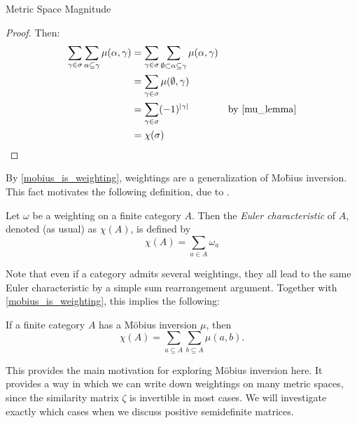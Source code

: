 \documentclass[12pt]{pom_thesis}
\begin{document}
\begin{chapter}{Metric Space Magnitude}
\begin{thm}
\end{thm}
\begin{proof}
Then:
\begin{align*}
\sum_{\gamma \in \sigma} \sum_{\alpha \subseteq \gamma} \mu(\alpha, \gamma) &= \sum_{\gamma \in \sigma} \sum_{\emptyset \subset \alpha \subseteq \gamma} \mu(\alpha, \gamma)\\
&= \sum_{\gamma \in \sigma} \mu(\emptyset, \gamma)\\
&= \sum_{\gamma \in \sigma} (-1)^{|\gamma|} &\text{by \ref{mu_lemma}}\\
&= \chi(\sigma)
\end{align*}
\end{proof}
By \ref{mobius_is_weighting}, weightings are a generalization of Mo\"bius inversion. This fact motivates the following definition, due to \cite{Lein1}.
\begin{defn}
Let $\omega$ be a weighting on a finite category $A$. Then the \emph{Euler characteristic} of $A$, denoted (as usual) as $\chi(A)$, is defined by
\[
\chi(A) = \sum_{a \in A} \omega_a
\]
\end{defn}
Note that even if a category admits several weightings, they all lead to the same Euler characteristic by a simple sum rearrangement argument. Together with \ref{mobius_is_weighting}, this implies the following:
\begin{cor}
If a finite category $A$ has a M\"obius inversion $\mu$, then
\[\chi(A) = \sum_{a \subseteq A} \sum_{b \subseteq A} \mu(a, b).
\]
\end{cor}
This provides the main motivation for exploring M\"obius inversion here. It provides a way in which we can write down weightings on many metric spaces, since the similarity matrix $\zeta$ is invertible in most cases. We will investigate exactly which cases when we discuss positive semidefinite matrices.
\end{chapter}


\end{document}
